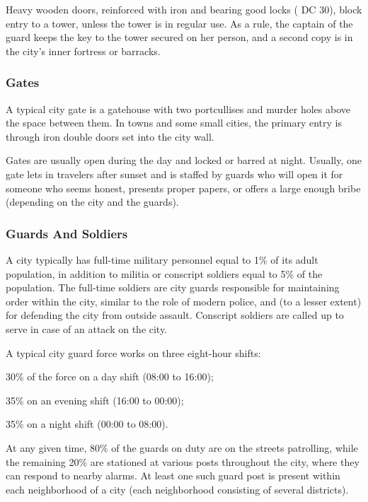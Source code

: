 Heavy wooden doors, reinforced with iron and bearing good locks ( DC 30), block entry to a tower, unless the tower is in regular use. As a rule, the captain of the guard keeps the key to the tower secured on her person, and a second copy is in the city's inner fortress or barracks.

\subsubsection{Gates}
A typical city gate is a gatehouse with two portcullises and murder holes above the space between them. In towns and some small cities, the primary entry is through iron double doors set into the city wall.

Gates are usually open during the day and locked or barred at night. Usually, one gate lets in travelers after sunset and is staffed by guards who will open it for someone who seems honest, presents proper papers, or offers a large enough bribe (depending on the city and the guards).

\subsubsection{Guards And Soldiers}
A city typically has full-time military personnel equal to 1\% of its adult population, in addition to militia or conscript soldiers equal to 5\% of the population. The full-time soldiers are city guards responsible for maintaining order within the city, similar to the role of modern police, and (to a lesser extent) for defending the city from outside assault. Conscript soldiers are called up to serve in case of an attack on the city.

A typical city guard force works on three eight-hour shifts:
\begin{itemize*}
\item 30\% of the force on a day shift (08:00 to 16:00);
\item 35\% on an evening shift (16:00 to 00:00);
\item 35\% on a night shift (00:00 to 08:00).
\end{itemize*}

At any given time, 80\% of the guards on duty are on the streets patrolling, while the remaining 20\% are stationed at various posts throughout the city, where they can respond to nearby alarms. At least one such guard post is present within each neighborhood of a city (each neighborhood consisting of several districts).


